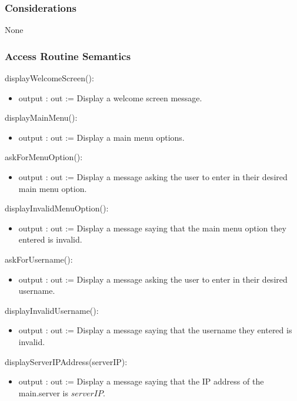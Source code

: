 \documentclass[12pt, titlepage]{article}
\begin{document}
    \subsubsection* {Considerations}
        None
    
    \subsubsection* {Access Routine Semantics}
        
        \noindent displayWelcomeScreen():
        \begin{itemize}
        \item output : out := Display a welcome screen message.
        \end{itemize}
        
        \noindent displayMainMenu():
        \begin{itemize}
        \item output : out := Display a main menu options.
        \end{itemize}
        
        \noindent askForMenuOption():
        \begin{itemize}
        \item output : out := Display a message asking the user to enter in their desired main menu option.
        \end{itemize}
        
        \noindent displayInvalidMenuOption():
        \begin{itemize}
        \item output : out := Display a message saying that the main menu option they entered is invalid.
        \end{itemize}
        
        \noindent askForUsername():
        \begin{itemize}
        \item output : out := Display a message asking the user to enter in their desired username.
        \end{itemize}
        
        \noindent displayInvalidUsername():
        \begin{itemize}
        \item output : out := Display a message saying that the username they entered is invalid.
        \end{itemize}
        
        \noindent displayServerIPAddress(serverIP):
        \begin{itemize}
        \item output : out := Display a message saying that the IP address of the main.server is $serverIP$.
        \end{itemize}
        
\end{document}
